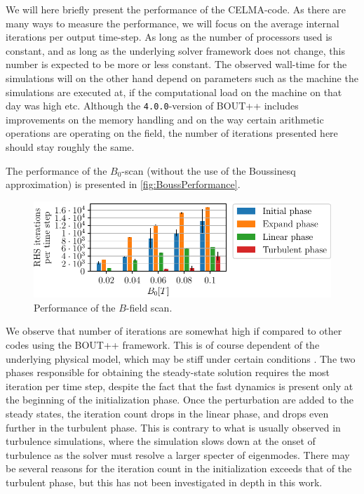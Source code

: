 %
We will here briefly present the performance of the CELMA-code.
As there are many ways to measure the performance, we will focus on the average internal iterations per output time-step.
As long as the number of processors used is constant, and as long as the underlying solver framework does not change, this number is expected to be more or less constant.
The observed wall-time for the simulations will on the other hand depend on parameters such as the machine the simulations are executed at, if the computational load on the machine on that day was high etc.
Although the \texttt{4.0.0}-version of BOUT++ includes improvements on the memory handling and on the way certain arithmetic operations are operating on the field, the number of iterations presented here should stay roughly the same.

The performance of the $B_0$-scan (without the use of the Boussinesq approximation) is presented in \cref{fig:BoussPerformance}.
%
\begin{figure}[htb]
    \centering
    \includegraphics{fig/results/performance/RHSEvalsPerTimeBScan}
    \caption{Performance of the $B$-field scan.}
    \label{fig:BPerformance}
\end{figure}
%
We observe that number of iterations are somewhat high if compared to other codes using the BOUT++ framework.
This is of course dependent of the underlying physical model, which may be stiff under certain conditions \cite{Leveque2007book}.
The two phases responsible for obtaining the steady-state solution requires the most iteration per time step, despite the fact that the fast dynamics is present only at the beginning of the initialization phase.
Once the perturbation are added to the steady states, the iteration count drops in the linear phase, and drops even further in the turbulent phase.
This is contrary to what is usually observed in turbulence simulations, where the simulation slows down at the onset of turbulence as the solver must resolve a larger specter of eigenmodes.
There may be several reasons for the iteration count in the initialization exceeds that of the turbulent phase, but this has not been investigated in depth in this work.
